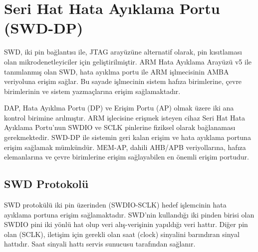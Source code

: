 \chapter{Seri Hat Hata Ayıklama Portu (SWD-DP)}

%
%
%

\acrfull{SWD}, iki pin bağlantısı ile, JTAG arayüzüne alternatif olarak, pin kısıtlaması olan mikrodenetleyiciler için geliştirilmiştir.
ARM Hata Ayıklama Arayüzü v5 ile tanımlanmış olan SWD, hata ayıklma portu ile ARM işlmecisinin \acrshort{AMBA} veriyoluna erişim sağlar. Bu sayade
işlmecinin sistem hafıza birimlerine, çevre birimlerinin ve sistem yazmaçlarına erişim sağlamaktadır.

\acrfull{DAP}, Hata Ayıklma Portu (\acrshort{DP}) ve Erişim Portu (\acrshort{AP}) olmak üzere iki ana kontrol birimine arılmıştır. ARM işlecisine erişmek isteyen cihaz
Seri Hat Hata Ayıklama Portu'nun SWDIO ve SCLK pinlerine fiziksel olarak bağlanaması gerekmektedir. SWD-DP ile sistemin geri kalan erişim ve hata ayıklama portuna erişim
sağlamak mümkündür. \acrfull{MEM-AP}, dahili AHB/APB veriyollarına, hafıza elemanlarına ve çevre birimlerine erişim sağlayabilen en önemli erişim portudur.


\section{SWD Protokolü}

SWD protokülü iki pin üzerinden (SWDIO-SCLK) hedef işlemcinin hata ayıklama portuna erişim sağlamaktadır. SWD'nin kullandığı iki pinden birisi olan SWDIO pini iki yönlü hat olup
veri alış-verişinin yapıldığı veri hattır. Diğer pin olan (SCLK), iletişim için gerekli olan saat (clock) sinyalini barındıran sinyal hattıdır. Saat sinyali hattı servis sunucusu tarafından
sağlanır.

